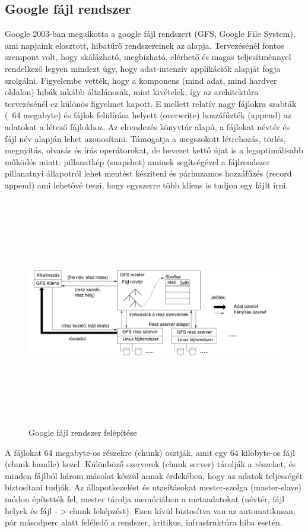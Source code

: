 \documentclass[a4paper,12pt]{article}
\begin{document}
\subsection{Google fájl rendszer}
Google 2003-ban megalkotta a google fájl rendszert (GFS, Google File System)\cite{gfs}, ami napjaink elosztott, hibatűrő rendszereinek az alapja. Tervezésénél fontos szempont volt, hogy skálázható, megbízható, elérhető és magas teljesítménnyel rendelkező legyen mindezt úgy, hogy adat-intenzív applikációk alapját fogja szolgálni. Figyelembe vették, hogy a komponens (mind adat, mind hardver oldalon) hibák inkább általánosak, mint kivételek, így az architektúra tervezésénél ez különös figyelmet kapott. E mellett relatív nagy fájlokra szabták (~64 megabyte) és fájlok felülírása helyett (overwrite) 
hozzáfűzték (append) az adatokat a létező fájlokhoz. Az elrendezés könyvtár alapú, a fájlokat névtér és fájl név alapján lehet azonosítani. Támogatja a megszokott létrehozás, törlés, megnyitás, olvasás és írás operátorokat, de bevezet kettő újat is a legoptimálisabb működés miatt: pillanatkép (snapshot) aminek segítségével a fájlrendszer pillanatnyi állapotról lehet mentést készíteni és párhuzamos hozzáfűzés (record append) ami lehetővé teszi, hogy egyszerre több kliens is tudjon egy fájlt írni. 

\begin{figure}[ht!]
\centering
\includegraphics[width=130mm, height=100mm, keepaspectratio]{img/gfs.png}
\caption{Google fájl rendszer felépítése~\cite{gfs}
\label{gfs}}
\end{figure}

A fájlokat 64 megabyte-os részekre (chunk) osztják, amit egy 64 kilobyte-os fájl (chunk handle) kezel. Különböző szerverek (chunk server) tárolják a részeket, és minden fájlból három másolat készül annak érdekében, hogy az adatok teljességét biztosítani tudják. Az állapotkezelést és utasításokat mester-szolga (master-slave) módon építették fel, mester tárolja memóriában a metaadatokat (névtér, fájl helyek és fájl - > chunk leképzést). Ezen kívül biztosítva van az automatikusan, pár másodperc alatt feléledő a rendszer, kritikus, infrastruktúra hiba esetén.
\end{document}
